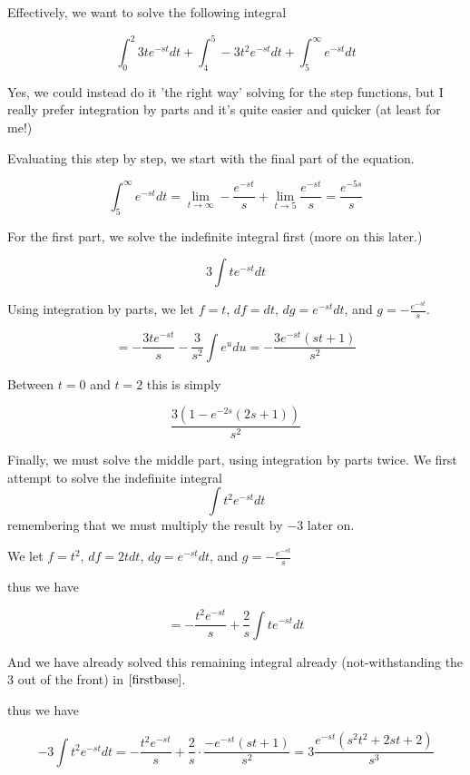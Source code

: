 \documentclass{article}
\begin{document}
Effectively, we want to solve the following integral

$$\int_{0}^{2} 3t e^{-st} dt  + \int_{4}^{5} -3t^2 e^{-st} dt + \int_{5}^{\infty} e^{-st} dt$$

Yes, we could instead do it 'the right way' solving for the step functions, but I really prefer integration by parts and it's quite easier and quicker (at least for me!)

Evaluating this step by step, we start with the final part of the equation.

\begin{equation}\label{last}
\int_{5}^{\infty} e^{-st} dt = \lim_{t \to \infty} -\frac{e^{-st}}{s} + \lim_{t \to 5} \frac{e^{-st}}{s} = \frac{e^{-5s}}{s}
\end{equation}

For the first part, we solve the indefinite integral first (more on this later.)

$$3\int t e^{-st} dt$$

Using integration by parts, we let $f=t$, $df=dt$, $dg=e^{-st}dt$, and $g=-\frac{e^{-st}}{s}$.

\begin{equation}\label{firstbase}
 = -\frac{3te^{-st}}{s}-\frac{3}{s^2}\int e^u du = -\frac{3e^{-st}(st+1)}{s^2}
\end{equation}

Between $t=0$ and $t=2$ this is simply

\begin{equation}\label{first}
\frac{3(1-e^{-2s}(2s+1))}{s^2}
\end{equation}


Finally, we must solve the middle part, using integration by parts twice.
We first attempt to solve the indefinite integral
$$\int t^2 e^{-st} dt$$
remembering that we must multiply the result by $-3$ later on.

We let $f=t^2$, $df=2tdt$, $dg=e^{-st}dt$, and $g=-\frac{e^{-st}}{s}$

thus we have

$$=-\frac{t^2e^{-st}}{s}+\frac{2}{s} \int t e^{-st} dt$$

And we have already solved this remaining integral already (not-withstanding the $3$ out of the front) in $\eqref{firstbase}$.

thus we have

$$-3 \int t^2 e^{-st} dt = -\frac{t^2e^{-st}}{s}+\frac{2}{s} \cdot \frac{-e^{-st}(st+1)}{s^2} = 3\frac{e^{-st}\left(s^2t^2+2st+2\right)}{s^3}$$
\end{document}
